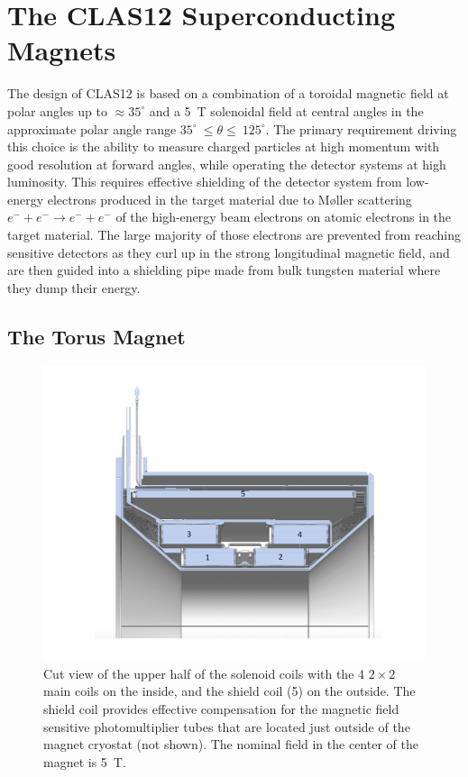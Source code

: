 \documentclass[final,3p,twocolumn]{elsarticle}
\begin{document}
\section{The CLAS12 Superconducting Magnets}

The design of CLAS12 is based on a combination of a toroidal magnetic field at polar angles up to $\approx 35^\circ$
and a 5~T solenoidal field at central angles in the approximate polar angle range $35^\circ~\le \theta \le~125^\circ$.
The primary requirement driving this choice is the ability to measure charged particles at high momentum with good
resolution at forward angles, while operating the detector systems at high luminosity. This requires effective
shielding of the detector system from low-energy electrons produced in the target material due to M{\o}ller
scattering $e^- + e^- \to e^- + e^-$ of the high-energy beam electrons on atomic electrons in the target material.
The large majority of those electrons are prevented from reaching sensitive detectors as they curl up in the strong
longitudinal magnetic field, and are then guided into a shielding pipe made from bulk tungsten material where they
dump their energy. 

\subsection{The Torus Magnet}
\label{torus}

\begin{figure}[htbp!]
\centerline{\includegraphics[width=0.9\columnwidth]{Solenoid.pdf}}
\caption{Cut view of the upper half of the solenoid coils with the 4 $2 \times 2$ main coils on the inside, and the
  shield coil (5) on the outside. The shield coil provides effective compensation for the magnetic field sensitive
  photomultiplier tubes that are located just outside of the magnet cryostat (not shown). The nominal field in the
  center of the magnet is 5~T.}
\label{solenoid-coils}
\end{figure}
\end{document}
